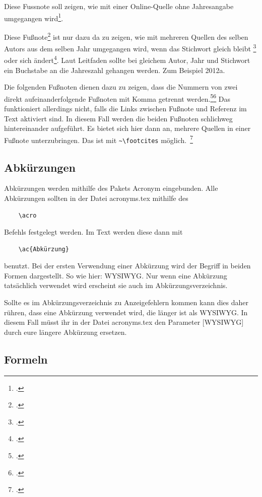 Diese Fussnote soll zeigen, wie mit einer Online-Quelle ohne Jahresangabe
umgegangen wird\footcite[Vgl.][o. S.]{Belastingdienst}.

Diese Fußnote\footcite[Vgl.][S.1]{Beckert.2012} ist nur dazu da zu zeigen, wie mit mehreren Quellen des selben Autors aus dem selben Jahr umgegangen wird, wenn das Stichwort gleich bleibt \footcite[Vgl.][S.2]{Beckert.2012.1} oder sich ändert\footcite[Vgl.][S.3]{Beckert.2012.2}. Laut Leitfaden sollte bei gleichem Autor, Jahr und Stichwort ein Buchstabe an die Jahreszahl gehangen werden. Zum Beispiel 2012a. 

Die folgenden Fußnoten dienen dazu zu zeigen, dass die Nummern von zwei direkt aufeinanderfolgende Fußnoten mit Komma getrennt werden.\footcite[Vgl.][S.2]{Beckert.2012.1}\footcite[Vgl.][S. 1]{Lucke2018}
Das funktioniert allerdings nicht, falls die Links zwischen Fußnote und Referenz im Text aktiviert sind. In diesem Fall werden die beiden Fußnoten schlichweg hintereinander aufgeführt. Es bietet sich hier dann an, mehrere Quellen in einer Fußnote unterzubringen.
Das ist mit \verb|~\footcites| möglich.~\footcites[\vglf][S. 20-40]{Liljegren2012}[][S. 55]{Balzert0.2008}

\subsection{Abkürzungen}
Abkürzungen werden mithilfe des Pakets Acronym eingebunden. Alle Abkürzungen sollten in der Datei acronyms.tex mithilfe des \begin{verbatim}
	\acro
\end{verbatim} Befehls festgelegt werden. Im Text werden diese dann mit \begin{verbatim}
	\ac{Abkürzung}
\end{verbatim} benutzt. Bei der ersten Verwendung einer Abkürzung wird der Begriff in beiden Formen dargestellt. So wie hier: \ac{WYSIWYG}. Nur wenn eine Abkürzung tatsächlich verwendet wird erscheint sie auch im Abkürzungsverzeichnis.

Sollte es im Abkürzungsverzeichnis zu Anzeigefehlern kommen kann dies daher rühren, dass eine Abkürzung verwendet wird, die länger ist als \ac{WYSIWYG}. In diesem Fall müsst ihr in der Datei acronyms.tex den Parameter [WYSIWYG] durch eure längere Abkürzung ersetzen.

\subsection{Formeln}

